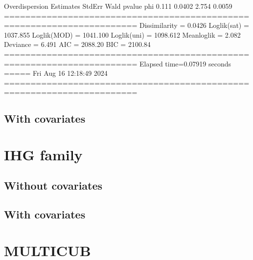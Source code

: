 \documentclass[letterpaper,10pt,english]{sphinxmanual}
\begin{document}
\begin{sphinxVerbatim}[commandchars=\\\{\}]
Overdispersion
     Estimates  StdErr    Wald  p\PYGZhy{}value
phi      0.111  0.0402   2.754   0.0059
=======================================================================
Dissimilarity = 0.0426
Loglik(sat)   = \PYGZhy{}1037.855
Loglik(MOD)   = \PYGZhy{}1041.100
Loglik(uni)   = \PYGZhy{}1098.612
Mean\PYGZhy{}loglik   = \PYGZhy{}2.082
Deviance      = 6.491
\PYGZhy{}\PYGZhy{}\PYGZhy{}\PYGZhy{}\PYGZhy{}\PYGZhy{}\PYGZhy{}\PYGZhy{}\PYGZhy{}\PYGZhy{}\PYGZhy{}\PYGZhy{}\PYGZhy{}\PYGZhy{}\PYGZhy{}\PYGZhy{}\PYGZhy{}\PYGZhy{}\PYGZhy{}\PYGZhy{}\PYGZhy{}\PYGZhy{}\PYGZhy{}\PYGZhy{}\PYGZhy{}\PYGZhy{}\PYGZhy{}\PYGZhy{}\PYGZhy{}\PYGZhy{}\PYGZhy{}\PYGZhy{}\PYGZhy{}\PYGZhy{}\PYGZhy{}\PYGZhy{}\PYGZhy{}\PYGZhy{}\PYGZhy{}\PYGZhy{}\PYGZhy{}\PYGZhy{}\PYGZhy{}\PYGZhy{}\PYGZhy{}\PYGZhy{}\PYGZhy{}\PYGZhy{}\PYGZhy{}\PYGZhy{}\PYGZhy{}\PYGZhy{}\PYGZhy{}\PYGZhy{}\PYGZhy{}\PYGZhy{}\PYGZhy{}\PYGZhy{}\PYGZhy{}\PYGZhy{}\PYGZhy{}\PYGZhy{}\PYGZhy{}\PYGZhy{}\PYGZhy{}\PYGZhy{}\PYGZhy{}\PYGZhy{}\PYGZhy{}\PYGZhy{}\PYGZhy{}
AIC = 2088.20
BIC = 2100.84
=======================================================================
Elapsed time=0.07919 seconds =====\PYGZgt{}\PYGZgt{}\PYGZgt{} Fri Aug 16 12:18:49 2024
=======================================================================
\end{sphinxVerbatim}

\noindent{}


\subsection{With covariates}
\label{\detokenize{manual:id197}}

\section{IHG family}
\label{\detokenize{manual:ihg-family}}

\subsection{Without covariates}
\label{\detokenize{manual:id198}}

\subsection{With covariates}
\label{\detokenize{manual:id199}}

\section{MULTICUB}
\label{\detokenize{manual:multicub}}
\end{document}
